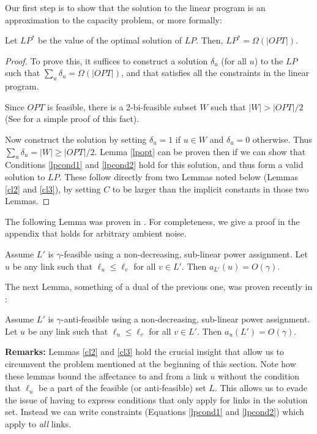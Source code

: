\documentclass[11pt]{amsart}
\begin{document}
Our first step is to show that the solution to the linear program is an approximation to the 
capacity problem, or more formally:
\begin{lemma}
Let $LP^*$ be the value of the optimal solution of $LP$. Then, $LP^* = \Omega(|OPT|)$.
\label{lpopt}
\end{lemma}
\begin{proof}
To prove this, it suffices to construct a solution $\delta_u$ (for all $u$) to the $LP$ such that
$\sum_u \delta_u = \Omega(|OPT|)$, and that satisfies all the constraints in the linear program.

Since $OPT$ is feasible, there is a 2-bi-feasible subset $W$ such that $|W| > |OPT|/2$ (See \cite{icalp11} for a simple proof of this
fact).

Now construct the solution by setting
$\delta_u = 1$ if $u \in W$ and $\delta_u = 0$ otherwise. Thus $\sum_u \delta_u = |W| \geq |OPT|/2$.  Lemma \ref{lpopt}
can be proven then if we can show that Conditions  \ref{lpcond1} and \ref{lpcond2} hold for this solution, and thus form a valid
solution to $LP$. These follow directly from two Lemmas noted below (Lemmas \ref{cl2} and \ref{cl3}), by setting
$C$ to be larger than the implicit constants in those two Lemmas.
\end{proof}


The following Lemma was proven in \cite{KV10}. For completeness, we give a proof in the
appendix that holds for arbitrary ambient noise.
\begin{lemma}
Assume $L'$ is $\gamma$-feasible using a non-decreasing, sub-linear power assignment. Let $u$ be any link such that $\ell_u \leq \ell_v$ for all $v \in L'$. Then $a_{L'}(u) = O(\gamma)$.
\label{cl2}
\end{lemma}

The next Lemma, something of a dual of the previous one, was proven recently in \cite{icalp11}:
\begin{lemma}
Assume $L'$ is $\gamma$-anti-feasible using a non-decreasing, sub-linear power assignment. Let $u$ be any link such that $\ell_u \leq \ell_v$ for all $v \in L'$. Then $a_u(L') = O(\gamma)$.
\label{cl3}
\end{lemma}

{\bf Remarks:} Lemmas \ref{cl2} and \ref{cl3} hold the crucial insight that allow us to circumvent the problem mentioned at the beginning
of this section. Note how these lemmas bound the affectance to and from a link $u$ without the condition that $\ell_u$ 
be a part of the feasible (or anti-feasible) set $L$. This allows us to evade the issue of having to express conditions
that only apply for links in the solution set. Instead we can write constraints (Equations
\ref{lpcond1} and \ref{lpcond2}) which apply to \emph{all} links.
\end{document}
